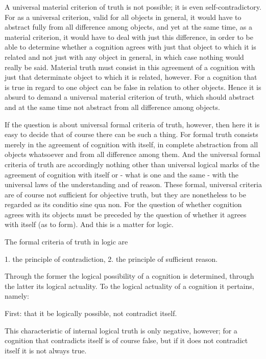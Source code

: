     A universal material criterion of truth is not possible;
    it is even self-contradictory.
    For as a universal criterion, valid for all objects in general, it
    would have to abstract fully from all difference among objects, and yet at
    the same time, as a material criterion, it would have to deal with just this
    difference, in order to be able to determine whether a cognition agrees
    with just that object to which it is related and not just with any object in
    general, in which case nothing would really be said.
    Material truth must consist in this agreement of a cognition with just that determinate object
    to which it is related, however.
    For a cognition that is true in regard to one
    object can be false in relation to other objects.
    Hence it is absurd to demand a universal material criterion of truth,
    which should abstract and at the same time not abstract from all difference among objects.

    If the question is about universal formal criteria of truth, however, then
    here it is easy to decide that of course there can be such a thing.
    For formal truth consists merely in the agreement of cognition with itself,
    in complete abstraction from all objects whatsoever and from all difference among them.
    And the universal formal criteria of truth are accordingly nothing
    other than universal logical marks of the agreement of cognition with itself
    or - what is one and the same - with the universal laws of the understanding and of reason.
    These formal, universal criteria are of course not sufficient for objective truth,
    but they are nonetheless to be regarded as its conditio sine qua non.
    For the question of whether cognition agrees with its objects
    must be preceded by the question of whether it agrees with itself (as to form).
    And this is a matter for logic.

    The formal criteria of truth in logic are

    1. the principle of contradiction,
    2. the principle of sufficient reason.

    Through the former the logical possibility of a cognition is determined,
    through the latter its logical actuality.
    To the logical actuality of a cognition it pertains, namely:

    First: that it be logically possible, not contradict itself.

        This characteristic of internal logical truth is only negative, however;
        for a cognition that contradicts itself is of course false,
        but if it does not contradict itself it is not always true.

